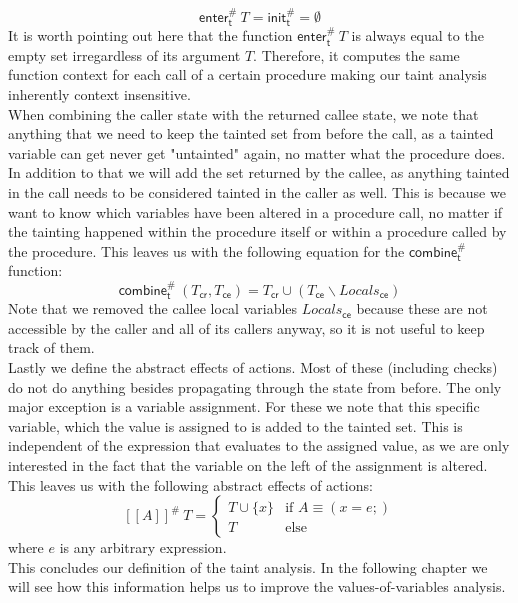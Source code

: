       \[\textsf{enter}^{\#}_\textsf{t}\ T = \textsf{init}^{\#}_\textsf{t} = \emptyset\]
      It is worth pointing out here that the function $\textsf{enter}^{\#}_\textsf{t}\ T$ is always equal to the empty set irregardless of its argument $T$. Therefore, it computes the same function context for each call of a certain procedure making our taint analysis inherently context insensitive.\\
      When combining the caller state with the returned callee state, we note that anything that we need to keep the tainted set from before the call, as a tainted variable can get never get "untainted" again, no matter what the procedure does. In addition to that we will add the set returned by the callee, as anything tainted in the call needs to be considered tainted in the caller as well. This is because we want to know which variables have been altered in a procedure call, no matter if the tainting happened within the procedure itself or within a procedure called by the procedure. This leaves us with the following equation for the $\textsf{combine}^{\#}_\textsf{t}$ function:
      \[ \textsf{combine}^{\#}_\textsf{t}\ (T_\textsf{cr}, T_\textsf{ce}) = T_\textsf{cr} \cup (T_\textsf{ce} \backslash Locals_\textsf{ce}) \]
      Note that we removed the callee local variables $Locals_\textsf{ce}$ because these are not accessible by the caller and all of its callers anyway, so it is not useful to keep track of them.\\
      Lastly we define the abstract effects of actions. Most of these (including checks) do not do anything besides propagating through the state from before. The only major exception is a variable assignment. For these we note that this specific variable, which the value is assigned to is added to the tainted set. This is independent of the expression that evaluates to the assigned value, as we are only interested in the fact that the variable on the left of the assignment is altered. This leaves us with the following abstract effects of actions:
      \[ [\![ A ]\!] ^{\#}\ T = \left\{ \begin{array}{lcr}
        T \cup \{x\} & \text{if }A \equiv (x = e;)\\
        T & \text{else}
      \end{array} \right.   \]
      where $e$ is any arbitrary expression.\\
      This concludes our definition of the taint analysis. In the following chapter we will see how this information helps us to improve the values-of-variables analysis.

